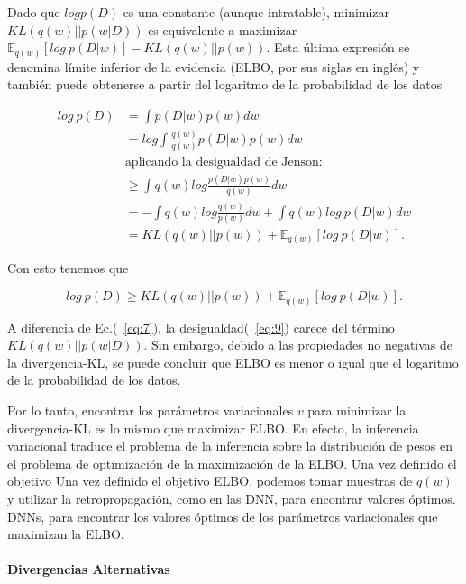 \documentclass[10pt, oneside, a4paper]{article}
\begin{document}
	Dado que $log p(D)$ es una constante (aunque intratable), minimizar $KL(q(w)||p(w|D))$ es equivalente a maximizar $\mathbb{E}_{q(w)} [log \: p(D|w)] - KL(q(w)||p(w))$. Esta última expresión se denomina límite inferior de la evidencia (ELBO, por sus siglas en inglés) y también puede obtenerse a partir del logaritmo de la probabilidad de los datos
	
	\begin{equation} \label{eq:8}
			\begin{split}
				log \: p(D) & = \int p(D|w)p(w) dw \\
				& = log \int \frac{q(w)}{q(w)} p(D|w)p(w) dw  \\
				& \text{aplicando la desigualdad de Jenson:} \\
				& \geq \int q(w) log \frac{p(D|w) p(w)}{q(w)} dw \\
				& = - \int q(w) log \frac{q(w)}{p(w)} dw + \int q(w) log \: p(D|w) dw \\
				& = KL(q(w) || p(w)) + \mathbb{E}_{q(w)} [log \: p(D|w)]. 
			\end{split}
	\end{equation}	

	Con esto tenemos que
	
	\begin{equation} \label{eq:9}
		log \: p(D) \geq KL(q(w) || p(w)) + \mathbb{E}_{q(w)} [log \: p(D|w)].
	\end{equation}

	A diferencia de Ec.(~\ref{eq:7}), la desigualdad(~\ref{eq:9}) carece del término $KL(q(w) || p(w|D))$. Sin embargo, debido a las propiedades no negativas de la divergencia-KL, se puede concluir que ELBO es menor o igual que el logaritmo de la probabilidad de los datos.
	
	Por lo tanto, encontrar los parámetros variacionales $v$ para minimizar la divergencia-KL es lo mismo que maximizar ELBO. En efecto, la inferencia variacional traduce el problema de la inferencia sobre la distribución de pesos en el problema de optimización de la maximización de la ELBO. Una vez definido el objetivo Una vez definido el objetivo ELBO, podemos tomar muestras de $q(w)$ y utilizar la retropropagación, como en las DNN, para encontrar valores óptimos. DNNs, para encontrar los valores óptimos de los parámetros variacionales que maximizan la ELBO.
	
	\paragraph{Divergencias Alternativas} 
	
\end{document}
